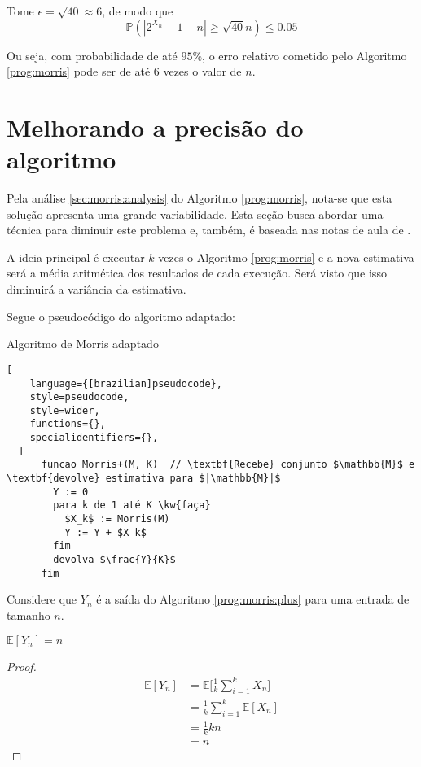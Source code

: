 Tome $\epsilon = \sqrt{40} \approx 6 $, de modo que 
\[ \mathbb{P}(|2^{X_n} - 1 - n| \geq \sqrt{40} n)  \leq 0.05 \]

Ou seja, com probabilidade de até $95\%$, o erro relativo cometido pelo Algoritmo \ref{prog:morris} pode ser de até $6$ vezes o valor de $n$.


\section{Melhorando a precisão do algoritmo}

Pela análise \ref{sec:morris:analysis} do Algoritmo \ref{prog:morris}, nota-se que esta solução apresenta uma grande variabilidade. 
Esta seção busca abordar uma técnica para diminuir este problema e, também, é baseada nas notas de aula de \citep{LectureNotesAndoni}.

A ideia principal é executar $k$ vezes o Algoritmo \ref{prog:morris} e a nova estimativa será a média aritmética dos resultados
de cada execução. Será visto que isso diminuirá a variância da estimativa.

Segue o pseudocódigo do algoritmo adaptado:
\begin{programruledcaption}{Algoritmo de Morris adaptado\label{prog:morris:plus}}
  \begin{lstlisting}[
    language={[brazilian]pseudocode},
    style=pseudocode,
    style=wider,
    functions={},
    specialidentifiers={},
  ]
      funcao Morris+(M, K)  // \textbf{Recebe} conjunto $\mathbb{M}$ e \textbf{devolve} estimativa para $|\mathbb{M}|$
        Y := 0
        para k de 1 até K \kw{faça}
          $X_k$ := Morris(M)
          Y := Y + $X_k$
        fim
        devolva $\frac{Y}{K}$
      fim
  \end{lstlisting}
\end{programruledcaption}

Considere que $Y_n$ é a saída do Algoritmo \ref{prog:morris:plus} para uma entrada de tamanho $n$.

\begin{lemma}\label{morris:plus:expected_value}
  $\mathbb{E}[Y_n] = n$
\end{lemma}

\begin{proof}

\begin{align*}
  \mathbb{E}[Y_n] 
    &= \mathbb{E} \Big[ \frac{1}{k} \sum_{i=1}^{k} X_n \Big]  \\
    &= \frac{1}{k} \sum_{i=1}^{k} \mathbb{E}[X_n] \\
    &= \frac{1}{k} k n  \\
    &= n
\end{align*}

\end{proof}

